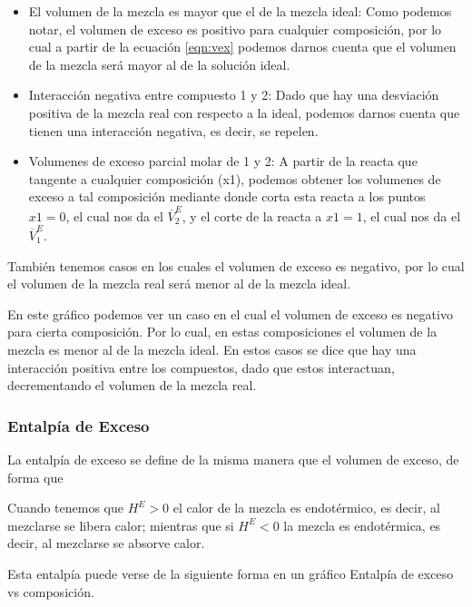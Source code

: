 \begin{itemize}
    \item El volumen de la mezcla es mayor que el de la mezcla ideal: Como podemos notar, el volumen de exceso es positivo para cualquier composición, por lo cual 
    a partir de la ecuación \ref{eqn:vex} podemos darnos cuenta que el volumen de la mezcla será mayor al de la solución ideal.
    \item Interacción negativa entre compuesto 1 y 2: Dado que hay una desviación positiva de la mezcla real con respecto a la ideal, podemos darnos cuenta que tienen una interacción negativa, es decir, se repelen.
    \item Volumenes de exceso parcial molar de 1 y 2: A partir de la reacta que tangente a cualquier composición (x1), podemos obtener los volumenes de exceso a tal composición mediante donde corta esta reacta a los puntos $x1=0$, el cual nos da el $\overline{V}_2^E$, y el corte de la reacta a $x1=1$, el cual nos da el $\overline{V}_1^E$.
\end{itemize}

También tenemos casos en los cuales el volumen de exceso es negativo, por lo cual el volumen de la mezcla real será menor al de la mezcla ideal.


En este gráfico podemos ver un caso en el cual el volumen de exceso es negativo para cierta composición. Por lo cual, en estas composiciones el volumen de la mezcla es menor al de la mezcla ideal. En estos casos
se dice que hay una interacción positiva entre los compuestos, dado que estos interactuan, decrementando el volumen de la mezcla real.

\subsubsection{Entalpía de Exceso}

La entalpía de exceso se define de la misma manera que el volumen de exceso, de forma que


Cuando tenemos que $H^{E}>0$ el calor de la mezcla es endotérmico, es decir, al mezclarse se libera calor; mientras que si $H^{E}<0$ la mezcla es endotérmica, es decir, al mezclarse se absorve calor.

Esta entalpía puede verse de la siguiente forma en un gráfico Entalpía de exceso vs composición.

